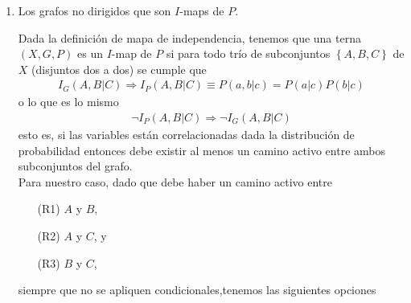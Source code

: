 \documentclass[12pt,a4paper]{article}
\begin{document}
\begin{enumerate}
\begin{enumerate}
\begin{proof}
\begin{align*}
                P(+b, +c | +a) & = \frac{P(+a, +b, +c)}{P(+a)} = 0.16 = P(+b | +a) P(+c | +a) \\
                P(+b, +c | \neg a) & = 0.08 = P(+b | \neg a) P(+c | \neg a) \\
                P(+b, \neg c | +a) & = 0.04 = P(+b | +a) P( \neg c | +a) \\
                P(+b, \neg c | \neg a) & = 0.32 = P(+b | \neg a) P(\neg c | \neg a) \\
                P(\neg b, +c | +a) & = 0.64 = P(\neg b | +a) P(+c | +a) \\
                P(\neg b, +c | \neg a) & = 0.12 = P(\neg b | \neg a) P(+c | \neg a)
            \end{align*}
            La igualdad se cumple para todos los valores y, por tanto, la relación es verdadera.
        \end{proof}

        \item $I_P(A, C | B)$: \; La relación es falsa.
         
        No se cumple que $P(+a, +c | +b) = P(+a | +b) P(+c | +b)$.

        \item $I_P(A, B | C)$: \; La relación es falsa.
         
        No se cumple que $P(+a, +b | +c) = P(+a | +c) P(+b | +c)$.
    \end{enumerate}
    \item Los grafos no dirigidos que son $I$-maps de $P$.
    
    Dada la definición de mapa de independencia, tenemos que una terna $(X, G, P)$ es un $I$-map de $P$ si para todo trío de subconjuntos $\left\{ A, B, C \right\}$ de $X$ (disjuntos dos a dos) se cumple que
    \begin{align}
        I_G(A, B | C) \Longrightarrow I_P(A, B | C) \equiv P(a, b | c) = P(a | c) P(b | c)
    \end{align}\label{ec:indc}
    o lo que es lo mismo
    \begin{align*}
        \neg I_P(A, B | C) \Longrightarrow \neg I_G(A, B | C)
    \end{align*}
    esto es, si las variables están correlacionadas dada la distribución de probabilidad entonces debe existir al menos un camino activo entre ambos subconjuntos del grafo.\\

    Para nuestro caso, dado que debe haber un camino activo entre 
    \begin{enumerate}
        \item[(R1)] $A$ y $B$,
        \item[(R2)] $A$ y $C$, y
        \item[(R3)] $B$ y $C$,
    \end{enumerate}
    siempre que no se apliquen condicionales,tenemos las siguientes opciones


\end{enumerate}
\end{document}
